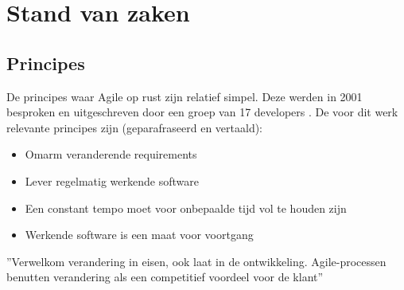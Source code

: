 
\section{Stand van zaken}
\label{sec:state-of-the-art}

%
%
%

\subsection{Principes}
De principes waar Agile op rust zijn relatief simpel. Deze werden in 2001 besproken en uitgeschreven door een groep van 17 developers \autocite{Beck2001}. De voor dit werk relevante principes zijn (geparafraseerd en vertaald):
\begin{itemize}
  \item Omarm veranderende requirements
  \item Lever regelmatig werkende software
  \item Een constant tempo moet voor onbepaalde tijd vol te houden zijn
  \item Werkende software is een maat voor voortgang
\end{itemize}


''Verwelkom verandering in eisen, ook laat in de ontwikkeling. Agile-processen benutten verandering als een competitief voordeel voor de klant''

